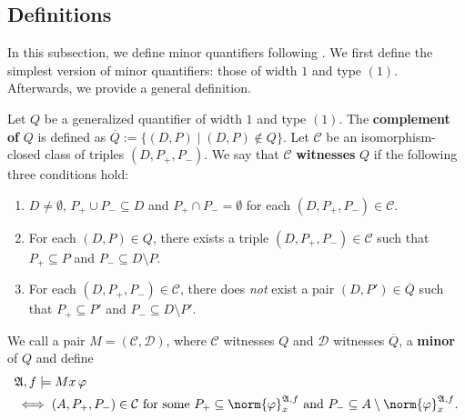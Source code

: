 \documentclass{article}
\theoremstyle{definition}
\begin{document}
\subsection{Definitions}

In this subsection, we define minor quantifiers following \cite{kuusisto2015double}. We first define the simplest version of minor quantifiers: those of width $1$ and type $(1)$. Afterwards, we provide a general definition.

Let $Q$ be a generalized quantifier of width $1$ and type $(1)$. The \textbf{complement of} $Q$ is defined as $\overline{Q}:=\{(D,P)\mid (D,P)\notin Q\}$. Let $\mathcal{C}$ be an isomorphism-closed class of triples $(D,P_+,P_-)$. We say that $\mathcal{C}$ \textbf{witnesses} $Q$ if the following three conditions hold:
\begin{enumerate}
    \item $D\neq\emptyset$, $P_+\cup P_-\subseteq D$ and $P_+\cap P_-=\emptyset$ for each $(D,P_+,P_-)\in \mathcal{C}$.
    \item For each $(D,P)\in Q$, there exists a triple $(D,P_+,P_-)\in\mathcal{C}$ such that $P_+\subseteq P$ and $P_-\subseteq D\setminus P$.
    \item For each $(D,P_+,P_-)\in\mathcal{C}$, there does \textit{not} exist a pair $(D,P')\in \overline{Q}$ such that $P_+\subseteq P'$ and $P_-\subseteq D\setminus P'$.
\end{enumerate}
We call a pair $M=(\mathcal{C},\mathcal{D})$, where $\mathcal{C}$ witnesses $Q$ and $\mathcal{D}$ witnesses $\overline{Q}$, a \textbf{minor} of $Q$ and define
\begin{align*}
    &\mathfrak{A},f\models Mx\, \varphi\\
    &\iff (A,P_+,P_-)\in \mathcal{C}
    \text{ for some } P_+ \subseteq \norm{\varphi}^{\mathfrak{A},f}_x \text{ and } P_-\subseteq A \setminus \norm{\varphi}^{\mathfrak{A},f}_x.
\end{align*}
\end{document}
